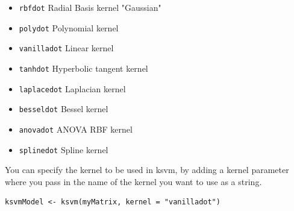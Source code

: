 \begin{itemize}
	\item \verb|rbfdot| Radial Basis kernel "Gaussian"
	\item \verb|polydot| Polynomial kernel
	\item \verb|vanilladot| Linear kernel
	\item \verb|tanhdot| Hyperbolic tangent kernel
	\item \verb|laplacedot| Laplacian kernel
	\item \verb|besseldot| Bessel kernel
	\item \verb|anovadot| ANOVA RBF kernel
	\item \verb|splinedot| Spline kernel
\end{itemize}

You can specify the kernel to be used in ksvm, by adding a kernel parameter where you pass in the name of the kernel you want to use as a string.

\begin{verbatim}
ksvmModel <- ksvm(myMatrix, kernel = "vanilladot")
\end{verbatim}


